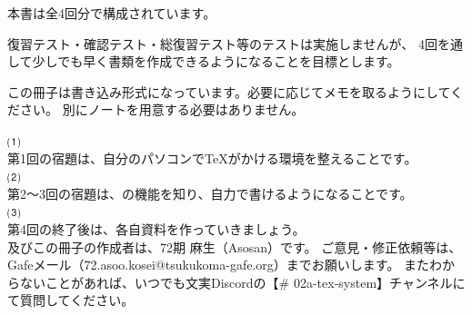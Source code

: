 \begin{multicols*}{2}
本書は全4回分で構成されています。

復習テスト・確認テスト・総復習テスト等のテストは実施しませんが、
4回を通して少しでも早く書類を作成できるようになることを目標とします。

この冊子は書き込み形式になっています。必要に応じてメモを取るようにしてください。
別にノートを用意する必要はありません。

\noindent ⑴ \\\indent 第1回の宿題は、自分のパソコンで\TeX がかける環境を整えることです。\\

\noindent ⑵ \\\indent 第2〜3回の宿題は、\BunTeX の機能を知り、自力で書けるようになることです。\\

\noindent ⑶ \\\indent 第4回の終了後は、各自資料を作っていきましょう。\\


\BunTeX 及びこの冊子の作成者は、72期 麻生（Asosan）です。
ご意見・修正依頼等は、Gafeメール（72.asoo.kosei@tsukukoma-gafe.org）までお願いします。
またわからないことがあれば、いつでも文実Discordの【\# 02a-tex-system】チャンネルにて質問してください。

\end{multicols*}